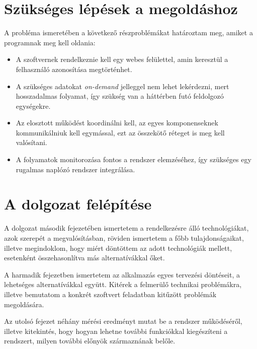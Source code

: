 \section{Szükséges lépések a megoldáshoz}

A probléma ismeretében a következő részproblémákat határoztam meg,
amiket a programnak meg kell oldania:

\begin{itemize}
  \item A szoftvernek rendelkeznie kell egy webes felülettel, amin keresztül a
felhasználó azonosítása megtörténhet.
  \item A szükséges adatokat \emph{on-demand} jelleggel nem lehet lekérdezni,
mert hosszadalmas folyamat, így szükség van a háttérben futó feldolgozó
egységekre.
  \item Az elosztott működést koordinálni kell, az egyes komponenseknek
kommunikálniuk kell egymással, ezt az összekötő réteget is meg kell valósítani.
  \item A folyamatok monitorozása fontos a rendszer elemzéséhez, így
szükséges egy rugalmas naplózó rendszer integrálása.
\end{itemize}

\section{A dolgozat felépítése}

A dolgozat második fejezetében ismertetem a rendelkezésre álló technológiákat,
azok szerepét a megvalósításban, röviden ismertetem a főbb tulajdonságaikat,
illetve megindoklom, hogy miért döntöttem az adott technológiák mellett,
esetenként összehasonlítva más alternatívákkal őket.

A harmadik fejezetben ismertetem az alkalmazás egyes tervezési döntéseit,
a lehetséges alternatívákkal együtt. Kitérek a felmerülő technikai problémákra,
illetve bemutatom a konkrét szoftvert feladatban kitűzött
problémák megoldására.

Az utolsó fejezet néhány mérési eredményt mutat be a rendszer működéséről,
illetve kitekintés, hogy hogyan lehetne további funkciókkal kiegészíteni
a rendszert, milyen további előnyök származnának belőle.
